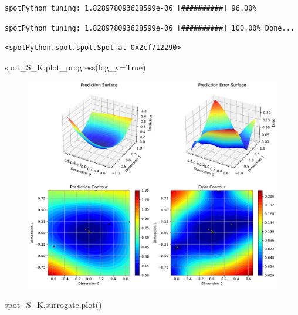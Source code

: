 \documentclass[
  letterpaper,
  DIV=11,
  numbers=noendperiod]{scrreprt}
\newenvironment{Shaded}{\begin{snugshade}}{\end{snugshade}}
\newcommand{\NormalTok}[1]{\textcolor[rgb]{0.00,0.23,0.31}{#1}}
\newcommand{\OperatorTok}[1]{\textcolor[rgb]{0.37,0.37,0.37}{#1}}
\newcommand{\VariableTok}[1]{\textcolor[rgb]{0.07,0.07,0.07}{#1}}
\begin{document}
\begin{verbatim}
spotPython tuning: 1.828978093628599e-06 [##########] 96.00% 
\end{verbatim}

\begin{verbatim}
spotPython tuning: 1.828978093628599e-06 [##########] 100.00% Done...
\end{verbatim}

\begin{verbatim}
<spotPython.spot.spot.Spot at 0x2cf712290>
\end{verbatim}

\begin{Shaded}
\begin{Highlighting}[]
\NormalTok{spot\_S\_K.plot\_progress(log\_y}\OperatorTok{=}\VariableTok{True}\NormalTok{)}
\end{Highlighting}
\end{Shaded}

\begin{figure}[H]

{\centering \includegraphics{012_num_spot_ei_files/figure-pdf/cell-40-output-1.pdf}

}

\end{figure}

\begin{Shaded}
\begin{Highlighting}[]
\NormalTok{spot\_S\_K.surrogate.plot()}
\end{Highlighting}
\end{Shaded}
\end{document}
